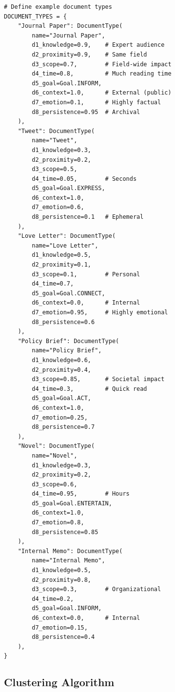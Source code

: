 \begin{verbatim}
# Define example document types
DOCUMENT_TYPES = {
    "Journal Paper": DocumentType(
        name="Journal Paper",
        d1_knowledge=0.9,    # Expert audience
        d2_proximity=0.9,    # Same field
        d3_scope=0.7,        # Field-wide impact
        d4_time=0.8,         # Much reading time
        d5_goal=Goal.INFORM,
        d6_context=1.0,      # External (public)
        d7_emotion=0.1,      # Highly factual
        d8_persistence=0.95  # Archival
    ),
    "Tweet": DocumentType(
        name="Tweet",
        d1_knowledge=0.3,
        d2_proximity=0.2,
        d3_scope=0.5,
        d4_time=0.05,        # Seconds
        d5_goal=Goal.EXPRESS,
        d6_context=1.0,
        d7_emotion=0.6,
        d8_persistence=0.1   # Ephemeral
    ),
    "Love Letter": DocumentType(
        name="Love Letter",
        d1_knowledge=0.5,
        d2_proximity=0.1,
        d3_scope=0.1,        # Personal
        d4_time=0.7,
        d5_goal=Goal.CONNECT,
        d6_context=0.0,      # Internal
        d7_emotion=0.95,     # Highly emotional
        d8_persistence=0.6
    ),
    "Policy Brief": DocumentType(
        name="Policy Brief",
        d1_knowledge=0.6,
        d2_proximity=0.4,
        d3_scope=0.85,       # Societal impact
        d4_time=0.3,         # Quick read
        d5_goal=Goal.ACT,
        d6_context=1.0,
        d7_emotion=0.25,
        d8_persistence=0.7
    ),
    "Novel": DocumentType(
        name="Novel",
        d1_knowledge=0.3,
        d2_proximity=0.2,
        d3_scope=0.6,
        d4_time=0.95,        # Hours
        d5_goal=Goal.ENTERTAIN,
        d6_context=1.0,
        d7_emotion=0.8,
        d8_persistence=0.85
    ),
    "Internal Memo": DocumentType(
        name="Internal Memo",
        d1_knowledge=0.5,
        d2_proximity=0.8,
        d3_scope=0.3,        # Organizational
        d4_time=0.2,
        d5_goal=Goal.INFORM,
        d6_context=0.0,      # Internal
        d7_emotion=0.15,
        d8_persistence=0.4
    ),
}
\end{verbatim}

\subsection{Clustering Algorithm}

